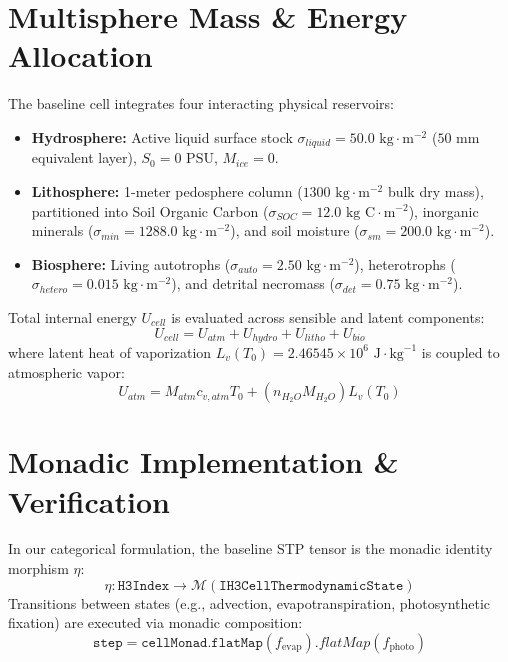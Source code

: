 \documentclass[10pt,journal,compsoc]{IEEEtran}
\begin{document}
\section{Multisphere Mass \& Energy Allocation}
The baseline cell integrates four interacting physical reservoirs:
\begin{itemize}
    \item \textbf{Hydrosphere:} Active liquid surface stock $\sigma_{liquid} = 50.0 \text{ kg}\cdot\text{m}^{-2}$ ($50 \text{ mm}$ equivalent layer), $S_0 = 0 \text{ PSU}$, $M_{ice} = 0$.
    \item \textbf{Lithosphere:} 1-meter pedosphere column ($1300 \text{ kg}\cdot\text{m}^{-2}$ bulk dry mass), partitioned into Soil Organic Carbon ($\sigma_{SOC} = 12.0 \text{ kg C}\cdot\text{m}^{-2}$), inorganic minerals ($\sigma_{min} = 1288.0 \text{ kg}\cdot\text{m}^{-2}$), and soil moisture ($\sigma_{sm} = 200.0 \text{ kg}\cdot\text{m}^{-2}$).
    \item \textbf{Biosphere:} Living autotrophs ($\sigma_{auto} = 2.50 \text{ kg}\cdot\text{m}^{-2}$), heterotrophs ($\sigma_{hetero} = 0.015 \text{ kg}\cdot\text{m}^{-2}$), and detrital necromass ($\sigma_{det} = 0.75 \text{ kg}\cdot\text{m}^{-2}$).
\end{itemize}

Total internal energy $U_{cell}$ is evaluated across sensible and latent components:
\begin{equation}
    U_{cell} = U_{atm} + U_{hydro} + U_{litho} + U_{bio}
\end{equation}
where latent heat of vaporization $L_v(T_0) = 2.46545 \times 10^6 \text{ J}\cdot\text{kg}^{-1}$ is coupled to atmospheric vapor:
\begin{equation}
    U_{atm} = M_{atm} c_{v,atm} T_0 + (n_{H_2O} M_{H_2O}) L_v(T_0)
\end{equation}

\section{Monadic Implementation \& Verification}
In our categorical formulation, the baseline STP tensor is the monadic identity morphism $\eta$:
\begin{equation}
    \eta: \mathtt{H3Index} \longrightarrow \mathcal{M}(\mathtt{IH3CellThermodynamicState})
\end{equation}
Transitions between states (e.g., advection, evapotranspiration, photosynthetic fixation) are executed via monadic composition:
\begin{equation}
    \mathtt{step} = \mathtt{cellMonad.flatMap}(f_{\text{evap}}).flatMap(f_{\text{photo}})
\end{equation}
\end{document}
